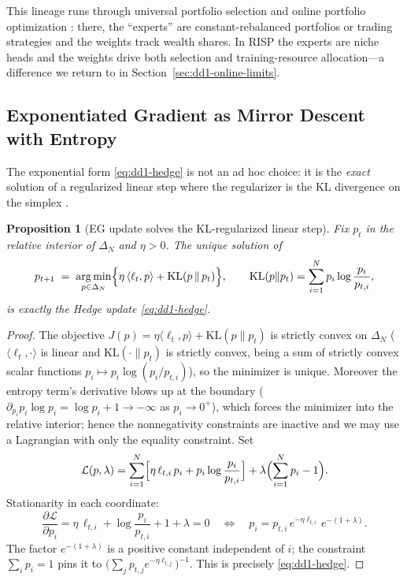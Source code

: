 \documentclass[11pt,a4paper]{article}
\theoremstyle{definition}
\theoremstyle{plain}
\newtheorem{proposition}{Proposition}[section]
\newcommand{\KL}{\mathrm{KL}}
\newcommand{\nm}{\textsc{RISP}}
\newcommand{\argmin}{\operatornamewithlimits{arg\,min}}
\begin{document}
This lineage runs through universal portfolio selection
\cite{cover1991universal} and online portfolio optimization
\cite{li2014online}: there, the ``experts'' are constant-rebalanced
portfolios or trading strategies and the weights track wealth shares. In
\nm{} the experts are niche heads and the weights drive both selection and
training-resource allocation---a difference we return to in
Section~\ref{sec:dd1-online-limits}.

\subsection{Exponentiated Gradient as Mirror Descent with Entropy}

The exponential form \eqref{eq:dd1-hedge} is not an ad hoc choice: it is the
\emph{exact} solution of a regularized linear step where the regularizer is
the KL divergence on the simplex \cite{kivinen1997exponentiated}.

\begin{proposition}[EG update solves the KL-regularized linear step]
\label{prop:dd1-eg-mirror}
Fix $p_t$ in the relative interior of $\Delta_N$ and $\eta > 0$. The unique
solution of
\begin{equation}
\label{eq:dd1-mirror-step}
p_{t+1} \;=\; \argmin_{p \in \Delta_N}
\Bigl\{ \eta\, \langle \ell_t, p \rangle + \KL(p \,\|\, p_t) \Bigr\},
\qquad
\KL(p \| p_t) = \sum_{i=1}^N p_i \log \frac{p_i}{p_{t,i}},
\end{equation}
is exactly the Hedge update \eqref{eq:dd1-hedge}.
\end{proposition}

\begin{proof}
The objective $J(p) = \eta \langle \ell_t, p\rangle + \KL(p\|p_t)$ is
strictly convex on $\Delta_N$ ($\langle \ell_t, \cdot\rangle$ is linear and
$\KL(\cdot \| p_t)$ is strictly convex, being a sum of strictly convex scalar
functions $p_i \mapsto p_i \log(p_i / p_{t,i})$), so the minimizer is unique.
Moreover the entropy term's derivative blows up at the boundary
($\partial_{p_i} p_i \log p_i = \log p_i + 1 \to -\infty$ as $p_i \to 0^+$),
which forces the minimizer into the relative interior; hence the
nonnegativity constraints are inactive and we may use a Lagrangian with only
the equality constraint. Set
\[
\mathcal{L}(p, \lambda)
= \sum_{i=1}^N \Bigl[ \eta\, \ell_{t,i}\, p_i
+ p_i \log \frac{p_i}{p_{t,i}} \Bigr]
+ \lambda \Bigl( \sum_{i=1}^N p_i - 1 \Bigr).
\]
Stationarity in each coordinate:
\[
\frac{\partial \mathcal{L}}{\partial p_i}
= \eta\, \ell_{t,i} + \log \frac{p_i}{p_{t,i}} + 1 + \lambda = 0
\quad\Longleftrightarrow\quad
p_i = p_{t,i}\, e^{-\eta \ell_{t,i}}\, e^{-(1 + \lambda)} .
\]
The factor $e^{-(1+\lambda)}$ is a positive constant independent of $i$;
the constraint $\sum_i p_i = 1$ pins it to
$\bigl(\sum_j p_{t,j} e^{-\eta \ell_{t,j}}\bigr)^{-1}$. This is precisely
\eqref{eq:dd1-hedge}.
\end{proof}
\end{document}
